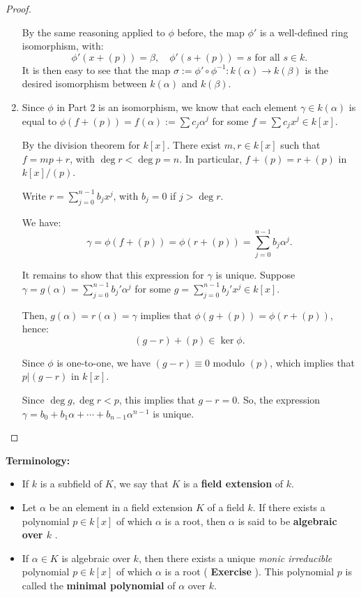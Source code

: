 \documentclass[a4paper,12pt]{report}
\newcommand{\ra}{\longrightarrow}
\numberwithin{statement}{chapter}
\numberwithin{equation}{chapter}
\numberwithin{section}{chapter}
\numberwithin{subsection}{section}
\begin{document}
\begin{proof}
\begin{enumerate}
By the same reasoning applied to $\phi$ before, the map $\phi'$
is a well-defined ring isomorphism, with:
\[
\phi'(x + (p)) = \beta,\quad \phi'(s + (p)) = s \text{ for all } s \in k.
\]
It is then easy to see that the map
$\sigma := \phi'\circ\phi^{-1} : k(\alpha) \ra k(\beta)$
is the desired isomorphism between $k(\alpha)$ and $k(\beta)$.


\item 
Since $\phi$ in Part 2 is an isomorphism,
we know that each element $\gamma \in k(\alpha)$
is equal to $\phi(f + (p)) = f(\alpha) := \sum c_j \alpha^j$
for some $f = \sum c_j x^j \in k[x]$.


By the division theorem for $k[x]$.  There exist $m, r \in k[x]$ such that $f = mp + r$,
with $\deg r < \deg p = n$.  In particular, $f + (p) = r + (p)$ in $k[x]/(p)$.




Write $r = \sum_{j = 0}^{n - 1} b_j x^j$, with $b_j = 0$ if $j > \deg r$.


We have:
\[
\gamma = \phi(f + (p)) = \phi(r + (p)) = \sum_{j = 0}^{n -1} b_j \alpha^j.
\]

It remains to show that this expression for $\gamma$ is unique.
Suppose $\gamma = g(\alpha) = \sum_{j = 0}^{n - 1} b_j' \alpha^j$ for some
$g = \sum_{j = 0}^{n - 1}b_j'x^j \in k[x]$.


Then, $g(\alpha) = r(\alpha) = \gamma$ implies that $\phi(g + (p)) = \phi(r + (p))$,
hence:
\[
(g - r) + (p) \in \ker \phi.
\]

Since $\phi$ is one-to-one, we have $(g - r) \equiv 0$ modulo $(p)$,
which implies that $p | (g - r)$ in $k[x]$.


Since $\deg g, \deg r < p$, this implies that $g - r = 0$.
So, the expression $\gamma = b_0 + b_1\alpha + \cdots + b_{n - 1}\alpha^{n - 1}$
is unique.


\end{enumerate}
\end{proof}




 {\bf Terminology:} 
\begin{itemize}
\item 
If $k$ is a subfield of $K$, we say that $K$ is a  {\bf field extension}  of $k$.

\item 
Let $\alpha$ be an element in a field extension $K$ of a field $k$.
If there exists a polynomial $p \in k[x]$ of which $\alpha$
is a root, then $\alpha$ is said to be  {\bf algebraic}   {\bf over $k$} .

\item 
If $\alpha \in K$ is algebraic over $k$, then there exists a unique
 {\it monic irreducible}  polynomial $p \in k[x]$ of which $\alpha$ is a root ( {\bf Exercise} ).
This polynomial $p$ is called the  {\bf minimal polynomial}  of $\alpha$ over $k$.
\end{itemize}
\end{document}
